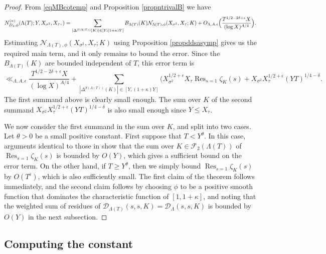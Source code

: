 \documentclass[10pt]{article}
\theoremstyle{plain}
\theoremstyle{definition}
\theoremstyle{remark}
\DeclareMathOperator{\Res}{Res}
\def\FF{{\mathcal F}}
\def\cD{{\mathcal D}}
\def\cN{{\mathcal N}}
\begin{document}
\begin{proof}
From \eqref{eqMBcotemp} and Proposition \ref{propntrivalB} we have
\begin{equation*}
N_{D_4,\phi}^{(\kappa)}(\Lambda(T);Y,X_{\sigma^2},X_\tau,)=
\sum_{|\Delta^{S(\Lambda(T))}(K)|\in[Y,(1+\kappa)Y]}
B_{\Lambda(T)}(K)\cN_{\Lambda(T),\phi}(X_{\sigma^2},X_\tau;K)+O_{\Lambda,A,\epsilon}
\Bigl(\frac{T^{1/2-2\delta+\epsilon}X}{(\log X)^{A/4}}\Bigr).
\end{equation*}
Estimating $\cN_{\Lambda(T),\phi}(X_{\sigma^2},X_\tau;K)$ using
Proposition \ref{propddsasymp} gives us the required main term, and it
only remains to bound the error. Since the $B_{\Lambda(T)}(K)$ are
bounded independent of $T$, this error term is
\begin{equation*}
  \ll_{\Lambda,A,\epsilon}\frac{T^{1/2-2\delta+\epsilon}X}{(\log X)^{A/4}}+\sum_{|\Delta^{S(\Lambda(T))}(K)|\in[Y,(1+\kappa)Y]}
  (X_{\sigma^2}^{1/2+\epsilon}X_\tau\Res_{s=1}\zeta_K(s)
  +X_{\sigma^2}X_\tau^{1/2+\epsilon}(YT)^{1/4-\delta}.
\end{equation*}
The first summand above is clearly small enough. The sum over $K$ of the second summand $X_{\sigma^2}X_\tau^{1/2+\epsilon}(YT)^{1/4-\delta}$ is also small enough
since $Y\leq X_\tau$.

We now consider the first summand in the sum over $K$, and split into two cases. Let
$\theta>0$ be a small positive constant. First suppose that
$T<Y^\theta$. In this case, arguments identical to those in
\cite[\S3]{MR12642} show that the sum over $K\in\FF_2(\Lambda(T))$ of
$\Res_{s=1}\zeta_K(s)$ is bounded by $O(Y)$, which gives a sufficient
bound on the error term. On the other hand, if $T\geq Y^\theta$, then
we simply bound $\Res_{s=1}\zeta_K(s)$ by $O(T^\epsilon)$, which is
also sufficiently small. The first claim of the theorem follows
immediately, and the second claim follows by choosing $\phi$ to be a
positive smooth function that dominates the characteristic function of
$[1,1+\kappa]$, and noting that the weighted sum of residues of
$\cD_{\Lambda(T)}(s,s,K)=\cD_{\Lambda}(s,s,K)$ is bounded by $O(Y)$ in
the next subsection.
\end{proof}


\subsection{Computing the constant}
\end{document}
